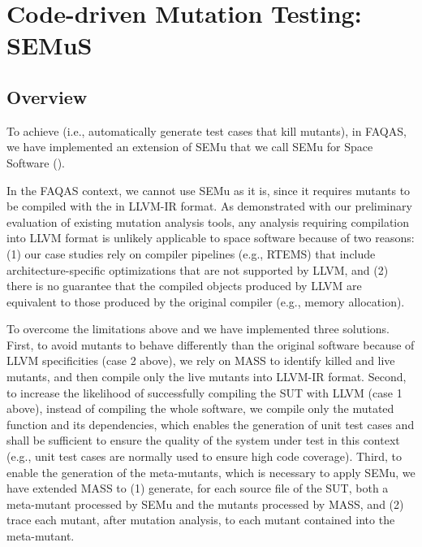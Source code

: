 
\newpage

\section{Code-driven Mutation Testing: SEMuS}

\subsection{Overview}
\label{sec:semus}





To achieve  (i.e., automatically generate test cases that kill mutants), in FAQAS, we have implemented an extension of SEMu that we call SEMu for Space Software ().



In the FAQAS context, we cannot use SEMu as it is, since it requires mutants to be compiled with the  in LLVM-IR format. As demonstrated with our preliminary evaluation of existing mutation analysis tools, any analysis requiring compilation into LLVM format is unlikely applicable to space software because of two reasons:  (1) our case studies rely on compiler pipelines (e.g., RTEMS) that include architecture-specific optimizations that are not supported by LLVM, and (2) there is no guarantee that the compiled objects produced by LLVM are equivalent to those produced by the original compiler (e.g., memory allocation).

To overcome the limitations above and  we have implemented three solutions.
First, to avoid mutants to behave differently than the original software because of LLVM specificities (case 2 above), we rely on  MASS to identify killed and live mutants, and then compile only the live mutants into LLVM-IR format.
Second, to increase the likelihood of successfully compiling the SUT with LLVM (case 1 above),  instead of compiling the whole software, we compile only the mutated function and its dependencies, which enables the generation of unit test cases and shall be sufficient to ensure the quality of the system under test in this context (e.g., unit test cases are normally used to ensure high code coverage). Third, to enable the generation of the meta-mutants, which is necessary to apply SEMu, we have extended MASS to (1) generate, for each source file of the SUT, both a meta-mutant processed by SEMu and the mutants processed by MASS, and (2) trace each mutant, after mutation analysis, to each mutant contained into the meta-mutant.





